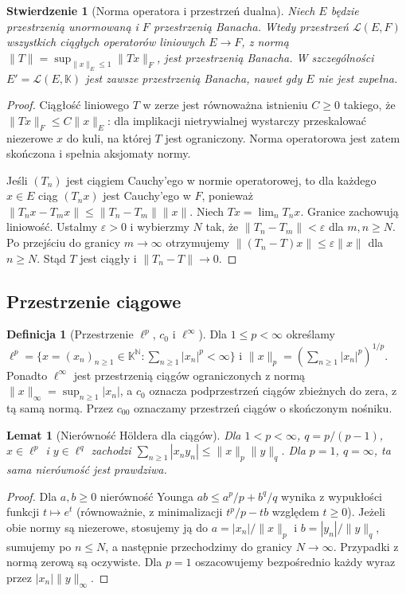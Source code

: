 \documentclass[11pt,a4paper]{article}
\numberwithin{equation}{section}
\theoremstyle{plain}
\newtheorem{stwierdzenie}[twierdzenie]{Stwierdzenie}
\newtheorem{lemat}[twierdzenie]{Lemat}
\theoremstyle{definition}
\newtheorem{definicja}[twierdzenie]{Definicja}
\theoremstyle{remark}
\newcommand{\N}{\mathbb N}
\newcommand{\K}{\mathbb K}
\begin{document}
\begin{stwierdzenie}[Norma operatora i przestrzeń dualna]
\label{prop:operator-norm12}
Niech $E$ będzie przestrzenią unormowaną i $F$ przestrzenią Banacha.
Wtedy przestrzeń $\mathcal L(E,F)$ wszystkich ciągłych operatorów
liniowych $E\to F$, z normą
$\|T\|=\sup_{\|x\|_E\le1}\|Tx\|_F$, jest przestrzenią Banacha.
W szczególności $E'=\mathcal L(E,\K)$ jest zawsze przestrzenią
Banacha, nawet gdy $E$ nie jest zupełna.
\end{stwierdzenie}
\begin{proof}
Ciągłość liniowego $T$ w zerze jest równoważna istnieniu $C\ge0$
takiego, że $\|Tx\|_F\le C\|x\|_E$: dla implikacji nietrywialnej
wystarczy przeskalować niezerowe $x$ do kuli, na której $T$ jest
ograniczony. Norma operatorowa jest zatem skończona i spełnia
aksjomaty normy.

Jeśli $(T_n)$ jest ciągiem Cauchy'ego w normie operatorowej,
to dla każdego $x\in E$ ciąg $(T_nx)$ jest Cauchy'ego w $F$, ponieważ
$\|T_nx-T_mx\|\le\|T_n-T_m\|\|x\|$.
Niech $Tx=\lim_nT_nx$. Granice zachowują liniowość. Ustalmy
$\varepsilon>0$ i wybierzmy $N$ tak, że
$\|T_n-T_m\|<\varepsilon$ dla $m,n\ge N$.
Po przejściu do granicy $m\to\infty$ otrzymujemy
$\|(T_n-T)x\|\le\varepsilon\|x\|$ dla $n\ge N$.
Stąd $T$ jest ciągły i $\|T_n-T\|\to0$.
\end{proof}

\subsection{Przestrzenie ciągowe}

\begin{definicja}[Przestrzenie $\ell^p$, $c_0$ i $\ell^\infty$]
\label{def:sequence-spaces12}
Dla $1\le p<\infty$ określamy
$\ell^p=\{x=(x_n)_{n\ge1}\in\K^{\N}:\sum_{n\ge1}|x_n|^p<\infty\}$
i $\|x\|_p=(\sum_{n\ge1}|x_n|^p)^{1/p}$.
Ponadto $\ell^\infty$ jest przestrzenią ciągów ograniczonych
z normą $\|x\|_\infty=\sup_{n\ge1}|x_n|$, a $c_0$ oznacza
podprzestrzeń ciągów zbieżnych do zera, z tą samą normą.
Przez $c_{00}$ oznaczamy przestrzeń ciągów o skończonym nośniku.
\end{definicja}

\begin{lemat}[Nierówność H\"oldera dla ciągów]
\label{lem:holder-seq12}
Dla $1<p<\infty$, $q=p/(p-1)$, $x\in\ell^p$ i $y\in\ell^q$
zachodzi
$\sum_{n\ge1}|x_ny_n|\le\|x\|_p\|y\|_q$.
Dla $p=1$, $q=\infty$, ta sama nierówność jest prawdziwa.
\end{lemat}
\begin{proof}
Dla $a,b\ge0$ nierówność Younga
$ab\le a^p/p+b^q/q$ wynika z wypukłości funkcji
$t\mapsto e^t$ (równoważnie, z minimalizacji
$t^p/p-tb$ względem $t\ge0$). Jeżeli obie normy są niezerowe,
stosujemy ją do $a=|x_n|/\|x\|_p$ i
$b=|y_n|/\|y\|_q$, sumujemy po $n\le N$,
a następnie przechodzimy do granicy $N\to\infty$.
Przypadki z normą zerową są oczywiste. Dla $p=1$
oszacowujemy bezpośrednio każdy wyraz przez
$|x_n|\|y\|_\infty$.
\end{proof}
\end{document}
